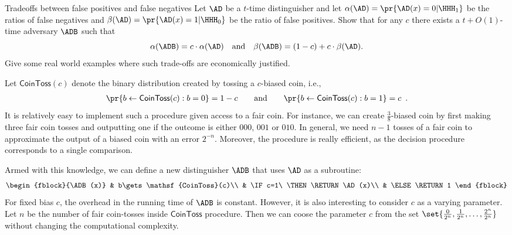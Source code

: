 \documentclass{crypto-exercise}
\author{Sven Laur}
\newcommand{\CTOSS}{\mathsf{CoinToss}}
\begin{document}
\begin{exercise}{Tradeoffs between false positives and false negatives}
Let $\AD$ be a $t$-time distinguisher and let $\alpha(\AD) = \pr{\AD(x) = 0|\HHH_1}$ be the ratios of false negatives and
$\beta(\AD) = \pr{\AD(x) = 1 | \HHH_0}$ be  the ratio of false positives.
Show that for any $c$ there exists a $t + O(1)$-time adversary $\ADB$ such that
$$\alpha(\ADB) = c \cdot \alpha(\AD) \quad \text{and} \quad \beta(\ADB) = (1-c) + c \cdot \beta(\AD).$$
Give some real world examples where such trade-offs are economically justified.
\end{exercise}
\begin{solution}
Let $\CTOSS(c)$ denote the binary distribution created by tossing a $c$-biased coin, i.e.,
\begin{align*}
 \pr{b\gets\CTOSS(c):b=0}=1-c
 \qquad\text{and}\qquad 
 \pr{b\gets\CTOSS(c):b=1}=c\enspace.
\end{align*}
It is relatively easy to implement such a procedure given access to a fair coin. For instance, we can create $\frac{3}{8}$-biased coin by first making three fair coin tosses and outputting one if the outcome is either $000$, $001$ or $010$. In general, we need $n-1$ tosses of a fair coin to approximate the output of a biased coin with an error $2^{-n}$. Moreover, the procedure is really efficient, as the decision procedure corresponds to a single comparison. 


Armed with this knowledge, we can define a new distinguisher $\ADB$ that uses $\AD$ as a subroutine:
\begin{align*}
\begin{fblock}{\ADB(x)}
& b\gets\CTOSS(c)\\
& \IF c=1\ \THEN \RETURN \AD(x)\\
& \ELSE \RETURN 1
\end{fblock}
\end{align*}
For fixed bias $c$, the overhead in the running time of $\ADB$ is constant. However, it is also interesting to consider $c$ as a varying parameter. Let $n$ be the number of fair coin-tosses inside $\CTOSS$ procedure. Then we can coose the parameter $c$ from the set $\set{\frac{0}{2^n},\frac{1}{2^n},\ldots, \frac{2^n}{2^n}}$ without changing the computational complexity.  


\end{solution}
\end{document}
